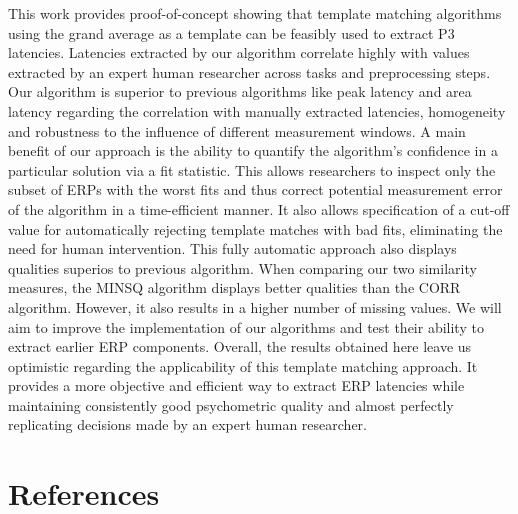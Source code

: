 \documentclass[
  man]{apa7}
\begin{document}
This work provides proof-of-concept showing that template matching algorithms using the grand average as a template can be feasibly used to extract P3 latencies. Latencies extracted by our algorithm correlate highly with values extracted by an expert human researcher across tasks and preprocessing steps. Our algorithm is superior to previous algorithms like peak latency and area latency regarding the correlation with manually extracted latencies, homogeneity and robustness to the influence of different measurement windows. A main benefit of our approach is the ability to quantify the algorithm's confidence in a particular solution via a fit statistic. This allows researchers to inspect only the subset of ERPs with the worst fits and thus correct potential measurement error of the algorithm in a time-efficient manner. It also allows specification of a cut-off value for automatically rejecting template matches with bad fits, eliminating the need for human intervention. This fully automatic approach also displays qualities superios to previous algorithm. When comparing our two similarity measures, the MINSQ algorithm displays better qualities than the CORR algorithm. However, it also results in a higher number of missing values. We will aim to improve the implementation of our algorithms and test their ability to extract earlier ERP components. Overall, the results obtained here leave us optimistic regarding the applicability of this template matching approach. It provides a more objective and efficient way to extract ERP latencies while maintaining consistently good psychometric quality and almost perfectly replicating decisions made by an expert human researcher.

\newpage

\hypertarget{references}{%
\section{References}\label{references}}
\end{document}
